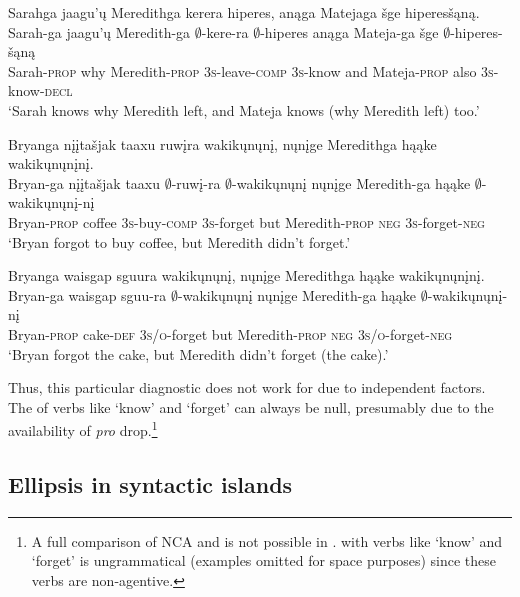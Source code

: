 \documentclass[output=paper]{LSP/langsci}
\begin{document}
\ex\label{ex:johnson:32b} 
\glll Sarahga jaagu'ų Meredithga kerera hiperes, anąga Matejaga šge hiperesšąną.\\
Sarah-ga jaagu'ų Meredith-ga $\emptyset$-kere-ra $\emptyset$-hiperes anąga Mateja-ga šge $\emptyset$-hiperes-šąną\\
Sarah-\textsc{prop} why Meredith-\textsc{prop} \textsc{3s}-leave-\textsc{comp} \textsc{3s}-know and Mateja-\textsc{prop} also \textsc{3s}-know-\textsc{decl}\\
\trans `Sarah knows why Meredith left, and Mateja knows (why Meredith left) too.'
\z
\z

 
\ea\label{ex:johnson:33}
\ea\label{ex:johnson:33a} 
\glll Bryanga {nįįtašjak taaxu} ruwįra wakikųnųnį, nųnįge Meredithga hąąke wakikųnųnįnį.\\
Bryan-ga {nįįtašjak taaxu} $\emptyset$-ruwį-ra $\emptyset$-wakikųnųnį nųnįge Meredith-ga hąąke $\emptyset$-wakikųnųnį-nį\\
Bryan-\textsc{prop} coffee \textsc{3s}-buy-\textsc{comp} \textsc{3s}-forget but Meredith-\textsc{prop} \textsc{neg} \textsc{3s}-forget-\textsc{neg}\\
\trans `Bryan forgot to buy coffee, but Meredith didn't forget.'
 
\ex\label{ex:johnson:33b} 
\glll Bryanga {waisgap sguura} wakikųnųnį, nųnįge Meredithga hąąke wakikųnųnįnį.\\
Bryan-ga {waisgap sguu-ra} $\emptyset$-wakikųnųnį nųnįge Meredith-ga hąąke $\emptyset$-wakikųnųnį-nį\\
Bryan-\textsc{prop} cake-\textsc{def} \textsc{3s/o}-forget but Meredith-\textsc{prop} \textsc{neg} \textsc{3s/o}-forget-\textsc{neg}\\
\trans `Bryan forgot the cake, but Meredith didn't forget (the cake).'
\z
\z


Thus, this particular diagnostic does not work for  due to independent factors. The  of verbs like `know' and `forget' can always be null, presumably due to the availability of  \emph{pro} drop.\footnote{A full comparison of NCA and  is not possible in .  with verbs like `know' and `forget' is ungrammatical (examples omitted for space purposes) since these verbs are non-agentive.}

\subsection{Ellipsis in syntactic islands}\label{sec:johnson:3.3}
\end{document}
